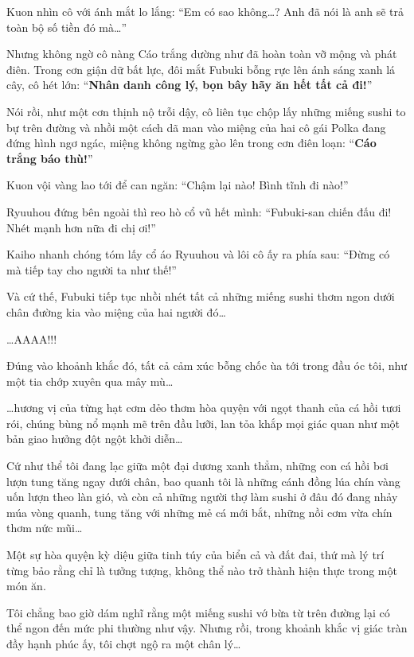 \documentclass[../main.tex]{subfiles}
\begin{document}
Kuon nhìn cô với ánh mắt lo lắng: ``Em có sao không\dots? Anh đã nói là anh sẽ trả toàn bộ số tiền đó mà\dots''

Nhưng không ngờ cô nàng Cáo trắng dường như đã hoàn toàn vỡ mộng và phát điên. Trong cơn giận dữ bất lực, đôi mắt Fubuki bỗng rực lên ánh sáng xanh lá cây, cô hét lớn: ``\textbf{Nhân danh công lý, bọn bây hãy ăn hết tất cả đi!}''

Nói rồi, như một cơn thịnh nộ trỗi dậy, cô liên tục chộp lấy những miếng sushi to bự trên đường và nhồi một cách dã man vào miệng của hai cô gái Polka đang đứng hình ngơ ngác, miệng không ngừng gào lên trong cơn điên loạn: ``\textbf{Cáo trắng báo thù!}''


Kuon vội vàng lao tới để can ngăn: ``Chậm lại nào! Bình tĩnh đi nào!''

Ryuuhou đứng bên ngoài thì reo hò cổ vũ hết mình: ``Fubuki-san chiến đấu đi! Nhét mạnh hơn nữa đi chị ơi!''

Kaiho nhanh chóng tóm lấy cổ áo Ryuuhou và lôi cô ấy ra phía sau: ``Đừng có mà tiếp tay cho người ta như thế!''

Và cứ thế, Fubuki tiếp tục nhồi nhét tất cả những miếng sushi thơm ngon dưới chân đường kia vào miệng của hai người đó\dots


\dots AAAA!!!

Đúng vào khoảnh khắc đó, tất cả cảm xúc bỗng chốc ùa tới trong đầu óc tôi, như một tia chớp xuyên qua mây mù\dots

\dots hương vị của từng hạt cơm dẻo thơm hòa quyện với ngọt thanh của cá hồi tươi rói, chúng bùng nổ mạnh mẽ trên đầu lưỡi, lan tỏa khắp mọi giác quan như một bản giao hưởng đột ngột khởi diễn\dots


Cứ như thể tôi đang lạc giữa một đại dương xanh thẳm, những con cá hồi bơi lượn tung tăng ngay dưới chân, bao quanh tôi là những cánh đồng lúa chín vàng uốn lượn theo làn gió, và còn cả những người thợ làm sushi ở đâu đó đang nhảy múa vòng quanh, tung tăng với những mẻ cá mới bắt, những nồi cơm vừa chín thơm nức mũi\dots

Một sự hòa quyện kỳ diệu giữa tinh túy của biển cả và đất đai, thứ mà lý trí từng bảo rằng chỉ là tưởng tượng, không thể nào trở thành hiện thực trong một món ăn.

Tôi chẳng bao giờ dám nghĩ rằng một miếng sushi vớ bừa từ trên đường lại có thể ngon đến mức phi thường như vậy. Nhưng rồi, trong khoảnh khắc vị giác tràn đầy hạnh phúc ấy, tôi chợt ngộ ra một chân lý\dots
\end{document}
